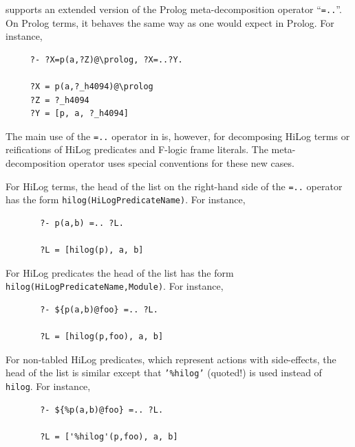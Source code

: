 \documentclass[11pt]{article}
\newcommand{\ERGO}{\mbox{\smaller{\ensuremath{\cal{E}}\smaller{{\sc{RGO}}}}}\xspace}
\newcommand{\FLSYSTEM}{\ERGO}
\begin{document}
\FLSYSTEM supports an extended version of the Prolog meta-decomposition
operator ``{\tt =..}''. On Prolog terms, it behaves the same way as one
would expect in Prolog. For instance, 
\begin{verbatim}
     ?- ?X=p(a,?Z)@\prolog, ?X=..?Y.
 
     ?X = p(a,?_h4094)@\prolog
     ?Z = ?_h4094
     ?Y = [p, a, ?_h4094]
\end{verbatim}

The main use of the {\tt =..} operator in \FLSYSTEM is, however, for
decomposing HiLog terms or reifications of HiLog predicates and F-logic
frame literals. The meta-decomposition operator uses special
conventions for these new cases.

For HiLog terms, the head of the list on the right-hand side of the {\tt =..}
operator has the form {\tt hilog(HiLogPredicateName)}. For instance, 
\begin{verbatim}
       ?- p(a,b) =.. ?L.
 
       ?L = [hilog(p), a, b]
\end{verbatim}
For HiLog predicates the head of the list has the form {\tt
  hilog(HiLogPredicateName,Module)}. For instance,
\begin{verbatim}
       ?- ${p(a,b)@foo} =.. ?L.
 
       ?L = [hilog(p,foo), a, b]
\end{verbatim}
For non-tabled HiLog predicates, which represent actions with side-effects,
the head of the list is similar except that {\tt '\%hilog'} (quoted!) is 
used instead of {\tt hilog}.  For instance,
\begin{verbatim}
       ?- ${%p(a,b)@foo} =.. ?L.
 
       ?L = ['%hilog'(p,foo), a, b]
\end{verbatim}
\end{document}
